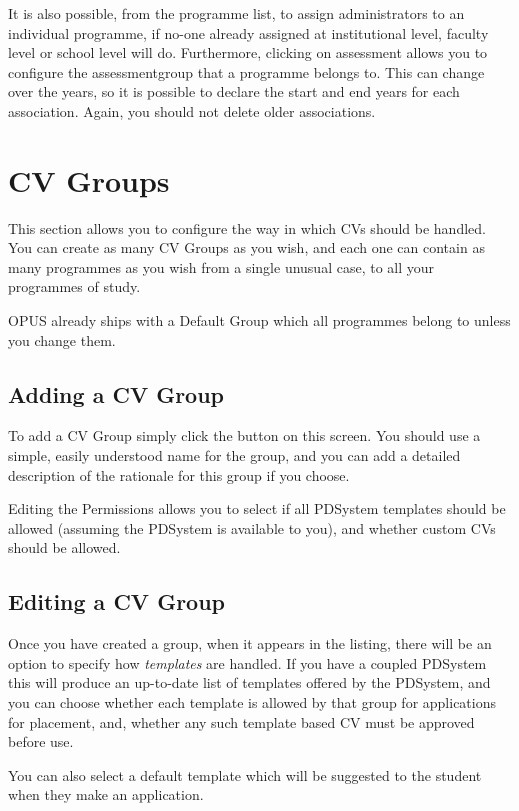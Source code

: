 \documentclass[12 pt]{book}
\begin{document}
It is also possible, from the programme list, to assign administrators to an
individual programme, if no-one already assigned at institutional level,
faculty level or school level will do. Furthermore, clicking on assessment
allows you to configure the assessmentgroup that a programme belongs to. This
can change over the years, so it is possible to declare the start and end years
for each association. Again, you should not delete older associations.

\section{CV Groups}
\label{CVGroups}


This section allows you to configure the way in which CVs should be handled.
You can create as many CV Groups as you wish, and each one can contain as many
programmes as you wish from a single unusual case, to all your programmes of
study.

OPUS already ships with a Default Group which all programmes belong to unless
you change them.

\subsection{Adding a CV Group}

To add a CV Group simply click the  button on this screen. You should
use a simple, easily understood name for the group, and you can add a detailed
description of the rationale for this group if you choose.

Editing the Permissions allows you to select if all PDSystem templates should 
be allowed (assuming the PDSystem is available to you), and whether custom CVs
should be allowed.

\subsection{Editing a CV Group}

Once you have created a group, when it appears in the listing, there will be
an option to specify how \emph{templates} are handled. If you have a coupled
PDSystem this will produce an up-to-date list of templates offered by the
PDSystem, and you can choose whether each template is allowed by that group
for applications for placement, and, whether any such template based CV must 
be approved before use.

You can also select a default template which will be suggested to the student
when they make an application.
\end{document}
